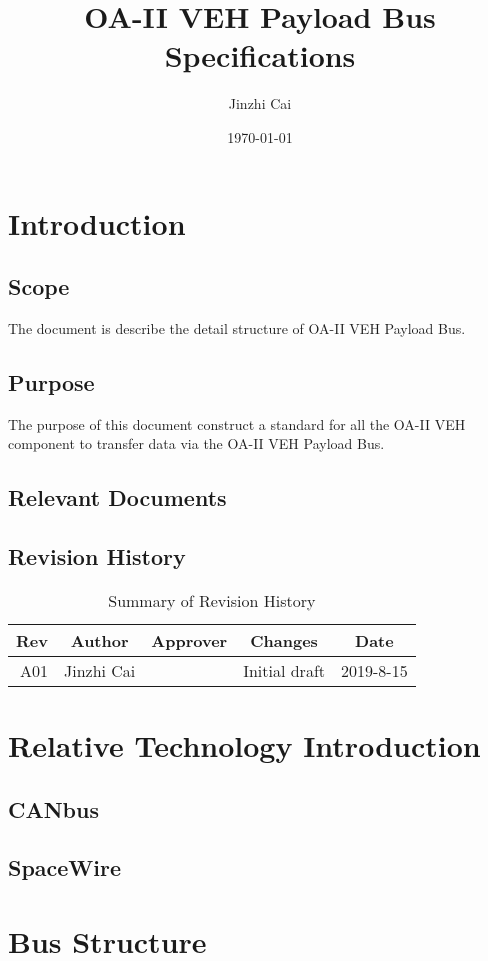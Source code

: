 \documentclass[12pt,article]{memoir}
\title{OA-II VEH Payload Bus Specifications}
\author{Jinzhi Cai}
\date{\today}
\begin{document}
	


\tableofcontents*
\clearpage


\chapter{Introduction}
\section{Scope}
The document is describe the detail structure of OA-II VEH Payload Bus.
\section{Purpose}
The purpose of this document construct a standard for all the OA-II VEH component to transfer data via the OA-II VEH Payload Bus.
\section{Relevant Documents}

\section{Revision History}
\begin{table}[H]
	\centering
	\begin{tabu}{r || c | c | c | c }
		Rev & Author & Approver & Changes & Date\\ \hline
		A01 & Jinzhi Cai & & Initial draft & 2019-8-15\\
	\end{tabu}
	\caption{Summary of Revision History}
	\label{tab:rev}
\end{table}
\newpage
\chapter{Relative Technology Introduction}
\section{CANbus}
\section{SpaceWire}
\newpage
\chapter{Bus Structure}
\end{document}
